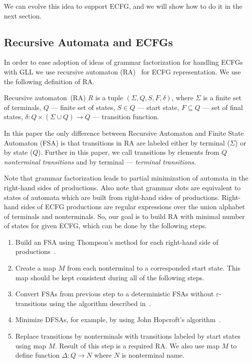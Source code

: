 \documentclass[runningheads,a4paper]{llncs}
\begin{document}
We can evolve this idea to support ECFG, and we will show how to do it in the next section.

\subsection{Recursive Automata and ECFGs}

In order to ease adoption of ideas of grammar factorization for handling ECFGs with GLL we use recursive automaton (RA)~\cite{tellier2006learning} for ECFG representation.
We use the following definition of RA.

\begin{mydef}
    Recursive automaton~(RA) $R$ is a tuple $(\Sigma, Q, S, F, \delta)$, where $\Sigma$ is a finite set of terminals, $Q$ --- finite set of states, $S \in Q$ --- start state, $F \subseteq Q$ --- set of final states, $\delta : Q \times (\Sigma \cup Q) \to Q$ --- transition function.
\end{mydef}

In this paper the only difference between Recursive Automaton and Finite State Automaton (FSA) is that
transitions in RA are labeled either by terminal ($\Sigma$) or by state ($Q$).
Further in this paper, we call transitions by elements from $Q$ \textit{nonterminal transitions} and by terminal --- \textit{terminal transitions}.

Note that grammar factorization leads to partial minimization of automata in the right-hand sides of productions.
Also note that grammar slots are equivalent to states of automata which are built from right-hand sides of productions.
Right-hand sides of ECFG productions are regular expressions over the union alphabet of terminals and nonterminals.
So, our goal is to build RA with minimal number of states for given ECFG, which can be done by the following steps.
\begin{enumerate} 
\item Build an FSA using Thompson's method for each right-hand side of productions~\cite{Thompson:1968:PTR:363347.363387}.
\item Create a map $M$ from each nonterminal to a corresponded start state.
This map should be kept consistent during all of the following steps. 
\item Convert FSAs from previous step to a deterministic FSAs without $\varepsilon$-transitions using the algorithm described in~\cite{aho1974design}.
\item Minimize DFSAs, for example, by using John Hopcroft's algorithm~\cite{hopcroft1971n}.
\item Replace transitions by nonterminals with transitions labeled by start states using map $M$.
Result of this step is a required RA. We also use map $M$ to define function $\Delta : Q \to N$ where $N$ is nonterminal name.
\end{enumerate}
\end{document}
